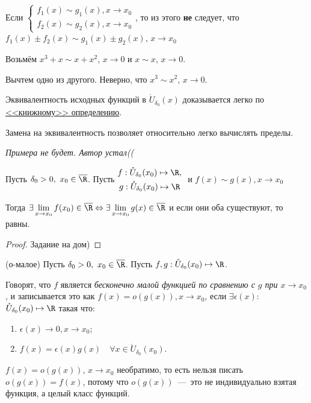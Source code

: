 \begin{note}
    Если $\left\{
    \begin{gathered}
        f_{1}(x) \sim g_{1}(x), x\to x_{0} \\
        f_{2}(x) \sim g_{2}(x), x\to x_{0}
    \end{gathered} \right.$, то из этого \textbf{не} следует, что $f_{1}(x) \pm f_{2} (x) \sim g_{1}(x) \pm g_{2} (x)$, $x\to x_{0}$
\end{note}

\begin{example}
    Возьмём $x^{3} + x \sim x + x^{2}$, $x \to 0$ и $x \sim x$, $x \to 0$. 
    
    Вычтем одно из другого. Неверно, что  $x^{3}\sim x^{2}$, $x\to 0$. 
\end{example}
\begin{note}
    Эквивалентность исходных функций в $\mathring{U}_{\delta_{0}} (x)$ доказывается легко по \hyperlink{def4.40}{<<книжному>> определению}.
\end{note}

Замена на эквивалентность позволяет относительно легко вычислять пределы.

\textit{Примера не будет. Автор устал((}

\begin{lemma}
    Пусть $\delta_{0} > 0, \ x_{0} \in \overline{\R}$. Пусть $ \begin{gathered}
        f: \mathring{U}_{\delta_{0}}(x_{0}) \mapsto \R, \\
        g:\mathring{U}_{\delta_{0}}(x_{0}) \mapsto \R
    \end{gathered}\ $ и $f(x) \sim g(x), x\to x_{0}$ 

    Тогда $\exists \lim\limits_{x\to x_{0}} f(x_{0}) \in \overline{\R} \Leftrightarrow \exists \lim\limits_{x\to x_{0}} g(x)\in \overline{\R}$ и если они оба существуют, то равны.
\end{lemma}
\begin{proof}
    Задание на дом)
\end{proof}

\begin{definition}
    (о-малое) Пусть $\delta_{0} > 0, \ x_{0} \in \overline{\R}$. Пусть $f, g: \mathring{U}_{\delta_{0}}(x_{0}) \mapsto \R$.

    Говорят, что $f$ является \textit{бесконечно малой функцией по сравнению с $g$ при $x \to x_{0}$}, и записывается это как $f(x) = o(g(x)), x \to x_{0}$, если $\exists \epsilon (x)$: $\mathring{U}_{\delta_{0}}(x_{0}) \mapsto \R$ такая что:
    \begin{enumerate}
        \item $\epsilon(x) \to 0, x\to x_{0}$;
        \item $f(x) = \epsilon(x)g(x) \quad \forall x \in \mathring{U}_{\delta_{0}}(x_{0})$.
    \end{enumerate}
\end{definition}
\begin{note} 
    $f(x) = o(g(x))$, $x \to x_{0}$ необратимо, то есть нельзя писать $o(g(x)) = f(x)$, потому что $o(g(x))$~---~это не индивидуально взятая функция, а целый класс функций. 
\end{note}

